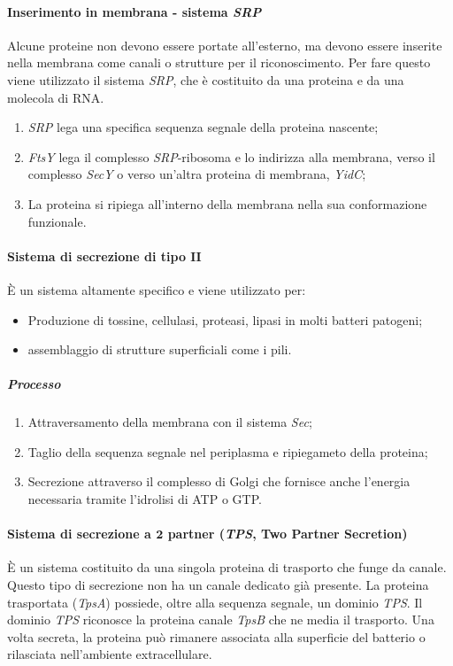			\paragraph{Inserimento in membrana - sistema \emph{SRP}}
			Alcune proteine non devono essere portate all'esterno, ma devono essere inserite nella membrana come canali o strutture per il riconoscimento. 
			Per fare questo viene utilizzato il sistema \emph{SRP}, che \`e costituito da una proteina e da una molecola di RNA.
			\begin{enumerate}
				\item \emph{SRP} lega una specifica sequenza segnale della proteina nascente; 
				\item \emph{FtsY} lega il complesso \emph{SRP}-ribosoma e lo indirizza alla membrana, verso il complesso \emph{SecY} o verso un'altra proteina di membrana, \emph{YidC};
	    			\item La proteina si ripiega all'interno della membrana nella sua conformazione funzionale.
			\end{enumerate}
	
			\paragraph{Sistema di secrezione di tipo $\mathbf{II}$}
			\`E un sistema altamente specifico e viene utilizzato per: 
			\begin{multicols}{2}
				\begin{itemize}
	    				\item Produzione di tossine, cellulasi, proteasi, lipasi in molti batteri patogeni; 
	    				\item assemblaggio di strutture superficiali come i pili.
				\end{itemize}
			\end{multicols}

				\subparagraph{Processo}
				\begin{enumerate}
					\item Attraversamento della membrana con il sistema \emph{Sec}; 
	    				\item Taglio della sequenza segnale nel periplasma e ripiegameto della proteina;
	    				\item Secrezione attraverso il complesso di Golgi che fornisce anche l'energia necessaria tramite l'idrolisi di ATP o GTP.
				\end{enumerate}

			\paragraph{Sistema di secrezione a $\mathbf{2}$ partner (\emph{TPS}, Two Partner Secretion)}
			\`E un sistema costituito da una singola proteina di trasporto che funge da canale. 
			Questo tipo di secrezione non ha un canale dedicato gi\`a presente.
			La proteina trasportata (\emph{TpsA}) possiede, oltre alla sequenza segnale, un dominio \emph{TPS}.
			Il dominio \emph{TPS} riconosce la proteina canale \emph{TpsB} che ne media il trasporto.
			Una volta secreta, la proteina pu\`o rimanere associata alla superficie del batterio o rilasciata nell'ambiente extracellulare. 

